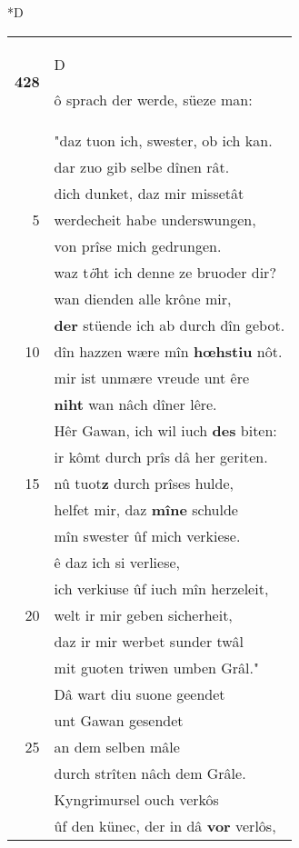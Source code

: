 \documentclass[8pt,a4paper,notitlepage]{article}
\begin{document}
\begin{table}[ht]
\begin{minipage}[t]{0.5\linewidth}
\small
\begin{center}*D
\end{center}
\begin{tabular}{rl}
\textbf{428} & \begin{large}D\end{large}ô sprach der werde, süeze man:\\ 
 & "daz tuon ich, swester, ob ich kan.\\ 
 & dar zuo gib selbe dînen rât.\\ 
 & dich dunket, daz mir missetât\\ 
5 & werdecheit habe underswungen,\\ 
 & von prîse mich gedrungen.\\ 
 & waz t\textit{ö}ht ich denne ze bruoder dir?\\ 
 & wan dienden alle krône mir,\\ 
 & \textbf{der} stüende ich ab durch dîn gebot.\\ 
10 & dîn hazzen wære mîn \textbf{hœhstiu} nôt.\\ 
 & mir ist unmære vreude unt êre\\ 
 & \textbf{niht} wan nâch dîner lêre.\\ 
 & Hêr Gawan, ich wil iuch \textbf{des} biten:\\ 
 & ir kômt durch prîs dâ her geriten.\\ 
15 & nû tuot\textbf{z} durch prîses hulde,\\ 
 & helfet mir, daz \textbf{mîne} schulde\\ 
 & mîn swester ûf mich verkiese.\\ 
 & ê daz ich si verliese,\\ 
 & ich verkiuse ûf iuch mîn herzeleit,\\ 
20 & welt ir mir geben sicherheit,\\ 
 & daz ir mir werbet sunder twâl\\ 
 & mit guoten triwen umben Grâl."\\ 
 & Dâ wart diu suone geendet\\ 
 & unt Gawan gesendet\\ 
25 & an dem selben mâle\\ 
 & durch strîten nâch dem Grâle.\\ 
 & Kyngrimursel ouch verkôs\\ 
 & ûf den künec, der in dâ \textbf{vor} verlôs,\\ 

\end{tabular}
\end{minipage}
\end{table}
\end{document}
